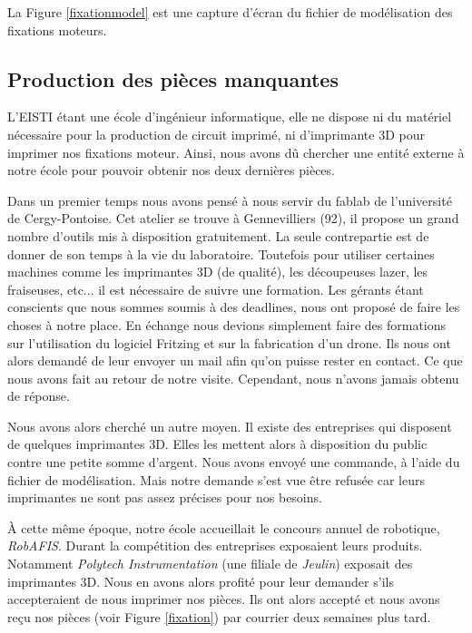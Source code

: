 \documentclass[a4paper,10pt]{report}
\begin{document}
	La Figure \ref{fixationmodel} est une capture d'écran du fichier de 
modélisation des fixations moteurs.

      \subsection{Production des pièces manquantes}
	L'EISTI étant une école d'ingénieur informatique, elle ne dispose ni 
du matériel nécessaire pour la production de circuit imprimé, ni d'imprimante 
3D pour imprimer nos fixations moteur. Ainsi, nous avons dû chercher une entité 
externe à notre école pour pouvoir obtenir nos deux dernières pièces. 

	Dans un premier temps nous avons pensé à nous servir du 
fablab\cite{faclab} de l'université de Cergy-Pontoise. Cet atelier se trouve à 
Gennevilliers (92), il propose un grand nombre d'outils mis à disposition 
gratuitement. La seule contrepartie est de donner de son temps à la vie du 
laboratoire. Toutefois pour utiliser certaines machines comme les imprimantes 
3D (de qualité), les découpeuses lazer, les fraiseuses, etc... il est 
nécessaire de suivre une formation. Les gérants étant conscients que nous 
sommes soumis à des deadlines, nous ont proposé de faire les choses à notre 
place. En échange nous devions simplement faire des formations sur 
l'utilisation du logiciel Fritzing et sur la fabrication d'un drone. Ils nous 
ont alors demandé de leur envoyer un mail afin qu'on puisse rester en contact. 
Ce que nous avons fait au retour de notre visite. Cependant, nous n'avons 
jamais obtenu de réponse.

      Nous avons alors cherché un autre moyen. Il existe des entreprises qui 
disposent de quelques imprimantes 3D. Elles les mettent alors à disposition du 
public contre une petite somme d'argent. Nous avons envoyé une commande, à 
l'aide du fichier de modélisation. Mais notre demande s'est vue être refusée 
car leurs imprimantes ne sont pas assez précises pour nos besoins.

      À cette même époque, notre école accueillait le concours annuel de 
robotique, \textit{RobAFIS}\cite{robafis}. Durant la compétition des 
entreprises exposaient leurs produits. Notamment \textit{Polytech 
Instrumentation}\cite{polytechinstru} (une filiale de 
\textit{Jeulin}\cite{jeulin}) exposait des imprimantes 3D. Nous en avons alors 
profité pour leur demander s'ils accepteraient de nous imprimer nos pièces. Ils 
ont alors accepté et nous avons reçu nos pièces (voir Figure \ref{fixation}) 
par courrier deux semaines plus tard.
\end{document}
